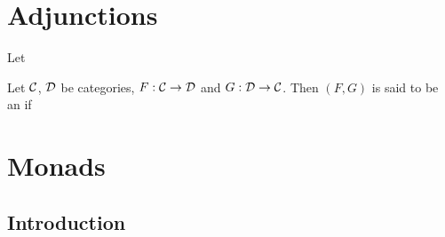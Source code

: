 \documentclass{book}
\begin{document}
	\newpage
	\chapter{Adjunctions}
	
	\begin{ex}
		Let 
	\end{ex}
	
	\begin{defn}
		Let $\mathcal{C}$, $\mathcal{D}$ be categories, $F: \mathcal{C} \rightarrow \mathcal{D}$ and $G: \mathcal{D} \rightarrow \mathcal{C}$. Then $(F,G)$ is said to be an  if 
	\end{defn}
	
	
	
	
	
	
	
	
	
	
	
	
	
	
	
	
	
	
	
	
	
	
	
	
	
	
	
	
	
	
	
	
	
	
	
	
	
	
	
	
	
	
	
	
	
	
	
	
	
	
	
	
	\chapter{Monads}
	
	\section{Introduction}
	
\end{document}
